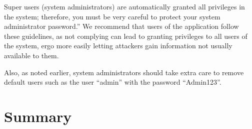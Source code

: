 \documentclass{report} %
\begin{document}
Super users (system administrators) are automatically granted all privileges
in the system; therefore, you must be very careful to protect your system
administrator password.'' \autocite[]{FLOSS}
We recommend that users of the application follow these guidelines, as not
complying can lead to granting privileges to all users of the system, ergo more
easily letting attackers gain information not usually available to them.
\autocite[]{FLOSS}

Also, as noted earlier, system administrators should take extra care to remove
default users such as the user ``admin'' with the password ``Admin123''.

\section{Summary}
\end{document}
